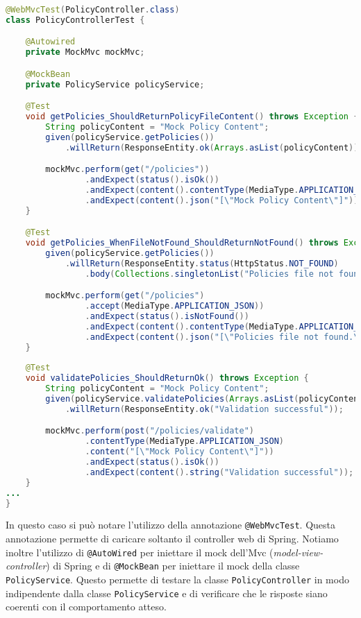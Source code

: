 \begin{lstlisting}[language=Java, caption=PolicyControllerTest, label=code:PolicyControllerTest, basicstyle=\fontsize{9}{10}\ttfamily]
@WebMvcTest(PolicyController.class)
class PolicyControllerTest {

    @Autowired
    private MockMvc mockMvc;

    @MockBean
    private PolicyService policyService;

    @Test
    void getPolicies_ShouldReturnPolicyFileContent() throws Exception {
        String policyContent = "Mock Policy Content";
        given(policyService.getPolicies())
            .willReturn(ResponseEntity.ok(Arrays.asList(policyContent)));

        mockMvc.perform(get("/policies"))
                .andExpect(status().isOk())
                .andExpect(content().contentType(MediaType.APPLICATION_JSON))
                .andExpect(content().json("[\"Mock Policy Content\"]"));
    }

    @Test
    void getPolicies_WhenFileNotFound_ShouldReturnNotFound() throws Exception {
        given(policyService.getPolicies())
            .willReturn(ResponseEntity.status(HttpStatus.NOT_FOUND)
                .body(Collections.singletonList("Policies file not found.")));

        mockMvc.perform(get("/policies")
                .accept(MediaType.APPLICATION_JSON))
                .andExpect(status().isNotFound())
                .andExpect(content().contentType(MediaType.APPLICATION_JSON))
                .andExpect(content().json("[\"Policies file not found.\"]"));
    }
    
    @Test
    void validatePolicies_ShouldReturnOk() throws Exception {
        String policyContent = "Mock Policy Content";
        given(policyService.validatePolicies(Arrays.asList(policyContent)))
            .willReturn(ResponseEntity.ok("Validation successful"));

        mockMvc.perform(post("/policies/validate")
                .contentType(MediaType.APPLICATION_JSON)
                .content("[\"Mock Policy Content\"]"))
                .andExpect(status().isOk())
                .andExpect(content().string("Validation successful"));
    }
...
}
\end{lstlisting}
In questo caso si può notare l'utilizzo della annotazione \texttt{@WebMvcTest}. Questa annotazione permette di caricare soltanto il controller web di Spring. Notiamo inoltre l'utilizzo di \texttt{@AutoWired} per iniettare il mock dell'Mvc (\emph{model-view-controller}) di Spring e di \texttt{@MockBean} per iniettare il mock della classe \texttt{PolicyService}. Questo permette di testare la classe \texttt{PolicyController} in modo indipendente dalla classe \texttt{PolicyService} e di verificare che le risposte siano coerenti con il comportamento atteso.\par
